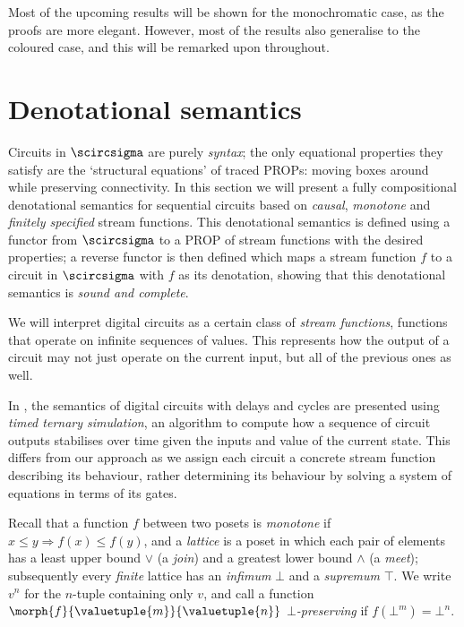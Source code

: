 \documentclass{lmcs}
\begin{document}
Most of the upcoming results will be shown for the monochromatic case, as the
proofs are more elegant.
However, most of the results also generalise to the coloured case, and this will
be remarked upon throughout.

\section{Denotational semantics}

Circuits in \(\scircsigma\) are purely \emph{syntax}; the only equational
properties they satisfy are the `structural equations' of traced PROPs: moving
boxes around while preserving connectivity.
In this section we will present a fully compositional denotational
semantics for sequential circuits based on \emph{causal}, \emph{monotone} and
\emph{finitely specified} stream functions.
This denotational semantics is defined using a functor from \(\scircsigma\) to a
PROP of stream functions with the desired properties; a reverse functor is then
defined which maps a stream function \(f\) to a circuit in \(\scircsigma\) with
\(f\) as its denotation, showing that this denotational semantics is
\emph{sound and complete}.

We will interpret digital circuits as a certain class of
\emph{stream functions}, functions that operate on infinite sequences of values.
This represents how the output of a circuit may not just operate on the current
input, but all of the previous ones as well.

\begin{rem}
    In \cite{mendler2012constructive}, the semantics of digital circuits with
    delays and cycles are presented using \emph{timed ternary simulation}, an
    algorithm to compute how a sequence of circuit outputs stabilises over time
    given the inputs and value of the current state.
    This differs from our approach as we assign each circuit a concrete stream
    function describing its behaviour, rather determining its behaviour by
    solving a system of equations in terms of its gates.
\end{rem}

Recall that a function \(f\) between two posets is \emph{monotone}
if \(x \leq y \Rightarrow f(x) \leq f(y)\), and a \emph{lattice} is a poset
in which each pair of elements has a least upper bound \(\vee\) (a \emph{join})
and a greatest lower bound \(\wedge\) (a \emph{meet}); subsequently
every \emph{finite} lattice has an \emph{infimum} \(\bot\) and a \emph{supremum}
\(\top\).
We write \(v^n\) for the \(n\)-tuple containing only \(v\), and call a function
\(\morph{f}{\valuetuple{m}}{\valuetuple{n}}\) \emph{\(\bot\)-preserving} if
\(f(\bot^m) = \bot^n\).
\end{document}
